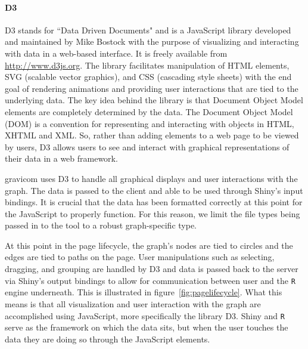\documentclass{article}\usepackage[]{graphicx}\usepackage[]{color}
\newcommand{\hh}[1]{{\color{magenta} #1}}
\begin{document}
\paragraph{D3}

D3 \cite{mb-d3} stands for ``Data Driven Documents" and is a JavaScript library developed and maintained by Mike Bostock with the  purpose of visualizing and interacting with data \hh{in a web-based interface}. It is freely available from \url{http://www.d3js.org}. The library facilitates manipulation of HTML elements, SVG (scalable vector graphics), and CSS (cascading style sheets) with the end goal of rendering animations and providing user interactions that are tied to the underlying data. The key idea behind the library is that Document Object Model elements are completely determined by the data. The Document Object Model (DOM) is a convention for representing and interacting with objects in HTML, XHTML and XML. So, rather than adding elements to a web page to be viewed by users, D3 allows users to see and interact with graphical representations of their data in a web framework. 

gravicom uses D3 to handle all graphical displays and user interactions with the graph. The data is passed to the client and able to be used through Shiny's input bindings. It is crucial that the data has been formatted correctly at this point for the JavaScript to properly function. For this reason, we limit the file types being passed in to the tool to a robust graph-specific type.

At this point in the page lifecycle, the graph's nodes are tied to circles and the edges are tied to paths on the page. User manipulations such as selecting, dragging, and grouping are handled by D3 and  data is passed back to the server via Shiny's output bindings to allow for communication between user and the {\tt R} engine underneath. This is illustrated in figure~\ref{fig:pagelifecycle}. What this means is that all visualization and user interaction with the graph are accomplished using JavaScript, more specifically the library D3. Shiny and {\tt R} serve as the framework on which the data sits, but when the user touches the data they are doing so through the JavaScript elements. 
\end{document}
